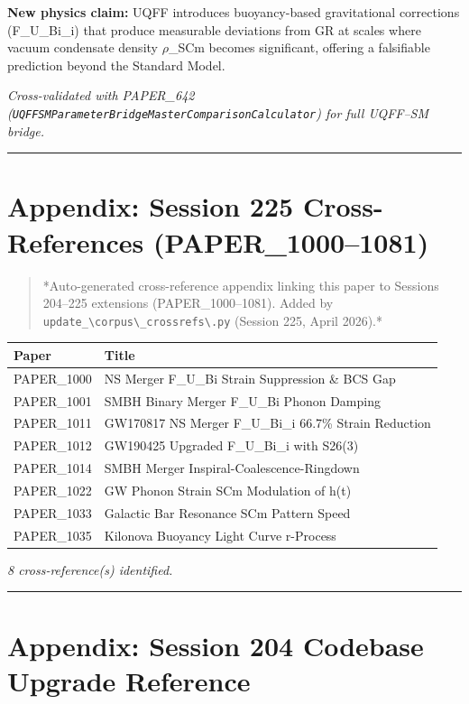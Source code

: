 \documentclass[12pt,a4paper]{article}
\begin{document}
\textbf{New physics claim:} UQFF introduces buoyancy-based gravitational corrections (F\_{U\_Bi\_i}) that produce measurable deviations from GR at scales where vacuum condensate density $\rho$\_SCm becomes significant, offering a falsifiable prediction beyond the Standard Model.

\emph{Cross-validated with PAPER\_642 (\texttt{UQFFSMParameterBridgeMasterComparisonCalculator}) for full UQFF--SM bridge.}

\medskip\hrule\medskip

\section{Appendix: Session 225 Cross-References (PAPER\_1000--1081)}

\begin{quote}
*Auto-generated cross-reference appendix linking this paper to
Sessions 204--225 extensions (PAPER\_1000--1081). Added by
\texttt{update\_\textbackslash {corpus\textbackslash \_crossrefs\textbackslash }.py} (Session 225, April 2026).*
\end{quote}

\begin{table}[H]
\centering
\small
\begin{tabularx}{\linewidth}{@{}>{\raggedright\arraybackslash}X>{\raggedright\arraybackslash}X@{}}
\toprule
Paper & Title \tabularnewline
\midrule
PAPER\_1000 & NS Merger F\_{U\_Bi} Strain Suppression \& BCS Gap \tabularnewline
PAPER\_1001 & SMBH Binary Merger F\_{U\_Bi} Phonon Damping \tabularnewline
PAPER\_1011 & GW170817 NS Merger F\_{U\_Bi\_i} 66.7\% Strain Reduction \tabularnewline
PAPER\_1012 & GW190425 Upgraded F\_{U\_Bi\_i} with S26(3) \tabularnewline
PAPER\_1014 & SMBH Merger Inspiral-Coalescence-Ringdown \tabularnewline
PAPER\_1022 & GW Phonon Strain SCm Modulation of h(t) \tabularnewline
PAPER\_1033 & Galactic Bar Resonance SCm Pattern Speed \tabularnewline
PAPER\_1035 & Kilonova Buoyancy Light Curve r-Process \tabularnewline
\bottomrule
\end{tabularx}
\end{table}

\emph{8 cross-reference(s) identified.}

\medskip\hrule\medskip

\section{Appendix: Session 204 Codebase Upgrade Reference}
\end{document}
